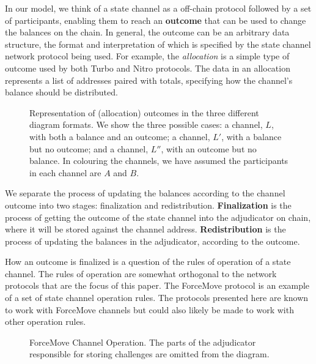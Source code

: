 In our model, we think of a state channel as a off-chain protocol followed by a set of participants,
enabling them to reach an \textbf{outcome} that can be used to change the balances on the chain.
In general, the outcome can be an arbitrary data structure, the format and interpretation of which
is specified by the state channel network protocol being used.
For example, the \textit{allocation} is a simple type of outcome used by both Turbo and Nitro
protocols.
The data in an allocation represents a list of addresses paired with totals,
specifying how the channel's balance should be distributed.

\begin{figure}[h]\centering
  \makebox[\textwidth][c]{}
  \caption{
    Representation of (allocation) outcomes in the three different diagram formats.
    We show the three possible cases: a channel, $L$, with both a balance and an outcome;
    a channel, $L'$, with a balance but no outcome; 
    and a channel, $L''$, with an outcome but no balance.
    In colouring the channels, we have assumed the participants in each channel are $A$ and $B$.
  }\label{fig:outcome-notation}
\end{figure} 

We separate the process of updating the balances according to the channel outcome into two stages:
finalization and redistribution.
\textbf{Finalization} is the process of getting the outcome of the state channel into the
adjudicator on chain, where it will be stored against the channel address.
\textbf{Redistribution} is the process of updating the balances in the adjudicator, according
to the outcome.

How an outcome is finalized is a question of the rules of operation of a state channel.
The rules of operation are somewhat orthogonal to the network protocols that are the focus of this paper.
The ForceMove protocol is an example of a set of state channel operation rules.
The protocols presented here are known to work with ForceMove channels but could also likely
be made to work with other operation rules.

\begin{figure}[h]\centering
  

  \caption{
    ForceMove Channel Operation.
    The parts of the adjudicator responsible for storing challenges are omitted from the diagram.
  }\label{fig:modes}
\end{figure}

